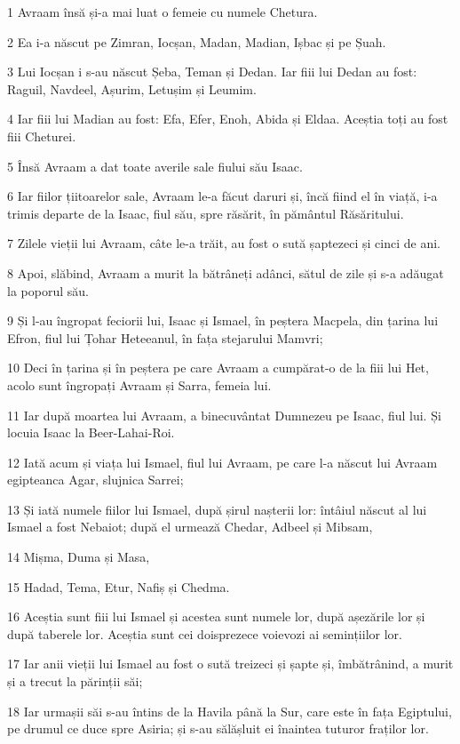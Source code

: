 \par 1 Avraam însă și-a mai luat o femeie cu numele Chetura.
\par 2 Ea i-a născut pe Zimran, Iocșan, Madan, Madian, Ișbac și pe Șuah.
\par 3 Lui Iocșan i s-au născut Șeba, Teman și Dedan. Iar fiii lui Dedan au fost: Raguil, Navdeel, Așurim, Letușim și Leumim.
\par 4 Iar fiii lui Madian au fost: Efa, Efer, Enoh, Abida și Eldaa. Aceștia toți au fost fiii Cheturei.
\par 5 Însă Avraam a dat toate averile sale fiului său Isaac.
\par 6 Iar fiilor țiitoarelor sale, Avraam le-a făcut daruri și, încă fiind el în viață, i-a trimis departe de la Isaac, fiul său, spre răsărit, în pământul Răsăritului.
\par 7 Zilele vieții lui Avraam, câte le-a trăit, au fost o sută șaptezeci și cinci de ani.
\par 8 Apoi, slăbind, Avraam a murit la bătrâneți adânci, sătul de zile și s-a adăugat la poporul său.
\par 9 Și l-au îngropat feciorii lui, Isaac și Ismael, în peștera Macpela, din țarina lui Efron, fiul lui Țohar Heteeanul, în fața stejarului Mamvri;
\par 10 Deci în țarina și în peștera pe care Avraam a cumpărat-o de la fiii lui Het, acolo sunt îngropați Avraam și Sarra, femeia lui.
\par 11 Iar după moartea lui Avraam, a binecuvântat Dumnezeu pe Isaac, fiul lui. Și locuia Isaac la Beer-Lahai-Roi.
\par 12 Iată acum și viața lui Ismael, fiul lui Avraam, pe care l-a născut lui Avraam egipteanca Agar, slujnica Sarrei;
\par 13 Și iată numele fiilor lui Ismael, după șirul nașterii lor: întâiul născut al lui Ismael a fost Nebaiot; după el urmează Chedar, Adbeel și Mibsam,
\par 14 Mișma, Duma și Masa,
\par 15 Hadad, Tema, Etur, Nafiș și Chedma.
\par 16 Aceștia sunt fiii lui Ismael și acestea sunt numele lor, după așezările lor și după taberele lor. Aceștia sunt cei doisprezece voievozi ai semințiilor lor.
\par 17 Iar anii vieții lui Ismael au fost o sută treizeci și șapte și, îmbătrânind, a murit și a trecut la părinții săi;
\par 18 Iar urmașii săi s-au întins de la Havila până la Sur, care este în fața Egiptului, pe drumul ce duce spre Asiria; și s-au sălășluit ei înaintea tuturor fraților lor.
